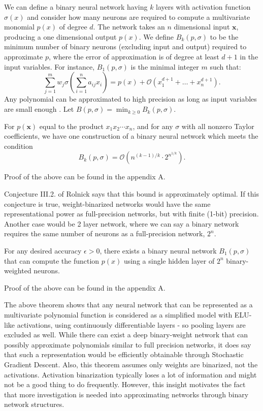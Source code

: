 \noindent We can define a binary neural network having $k$ layers with activation function $\sigma(x)$  and consider how many neurons are required to compute a multivariate monomial $p(x)$ of degree $d$. The network takes an $n$ dimensional input $\mathbf{x}$, producing a one dimensional output $p(x)$. We define $B_k(p,\sigma)$ to be the minimum number of binary neurons (excluding input and output) required to approximate $p$, where the error of approximation is of degree at least $d+1$ in the input variables. For instance, $B_1(p,\sigma)$ is the minimal integer $m$ such that:
$$\sum_{j=1}^m w_j \sigma\left(\sum_{i=1}^n a_{ij} x_i\right) = p(x) + \mathcal{O}(x_1^{d + 1} + \ldots + x_n^{d + 1}).$$ 
Any polynomial can be approximated to high precision as long as input variables are small enough \cite{lin2017does}. Let $B(p, \sigma) = \min_{k \geq 0} B_k(p, \sigma)$.

\begin{theorem}
\label{theorem:binaryrepresentation}
For $p(\mathbf{x})$ equal to the product $x_1x_2\cdots x_n$, and for any $\sigma$ with all nonzero Taylor coefficients, we have one construction of a binary neural network which meets the condition
\begin{equation}
B_k(p, \sigma) = \mathcal{O}\left(n^{(k-1)/k}\cdot 2^{n^{1/k}}\right).\label{eqn:constantlayers}
\end{equation}

Proof of the above can be found in the appendix A. 
\end{theorem}

\noindent Conjecture III.2. of Rolnick \etal \cite{rolnick2017power} says that this bound is approximately optimal. If this conjecture is true, weight-binarized networks would have the same representational  power as full-precision networks, but with finite (1-bit) precision. Another case would be 2 layer network, where we can say a binary network requires the same number of neurons as a full-precision network, $2^n$. 

\begin{theorem}
For any desired accuracy $\epsilon>0$, there exists a binary neural network $B_1(p,\sigma)$ that can compute the function $p(x)$ using a single hidden layer of $2^n$ binary-weighted neurons.

Proof of the above can be found in the appendix A.
\end{theorem}

\noindent The above theorem shows that any neural network that can be represented as a multivariate polynomial function is considered as a simplified model with ELU-like activations, using continuously differentiable layers - so pooling layers are excluded as well. While there can exist a deep binary-weight network that can possibly approximate polynomials similar to full precision networks, it does say that such a representation would be efficiently obtainable through Stochastic Gradient Descent. Also, this theorem assumes only weights are binarized, not the activations. Activation binarization typically loses a lot of information and might not be a good thing to do frequently. However, this insight motivates the fact that more investigation is needed into approximating networks through binary network structures.

